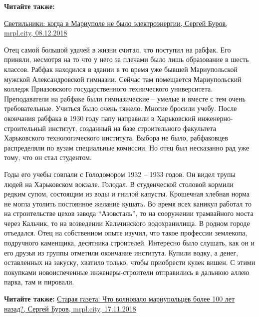 \textbf{Читайте также:} 

\href{https://mrpl.city/blogs/view/svetilniki-kogda-v-mariupole-ne-bylo-e-lektroe-nergii}{%
Светильники: когда в Мариуполе не было электроэнергии, Сергей Буров, mrpl.city, 08.12.2018}

Отец самой большой удачей в жизни считал, что поступил на рабфак. Его приняли,
несмотря на то что у него за плечами было лишь образование в шесть классов.
Рабфак находился в здании в то время уже бывшей Мариупольской мужской
Александровской гимназии. Сейчас там помещается Мариупольский колледж
Приазовского государственного технического университета. Преподаватели на
рабфаке были гимназические – умелые и вместе с тем очень требовательные.
Учиться было очень тяжело. Многие бросили учебу. После окончания рабфака в 1930
году папу направили в Харьковский инженерно-строительный институт, созданный на
базе строительного факультета Харьковского технологического института. Выбора
не было, рабфаковцев распределяли по вузам специальные комиссии. Но отец был
несказанно рад уже тому, что он стал студентом.

Годы его учебы совпали с Голодомором 1932 – 1933 годов. Он видел трупы людей на
Харьковском вокзале. Голодал. В студенческой столовой кормили редким супом,
состоящим из воды и гнилой капусты. Крошечная хлебная норма не могла утолить
постоянное желание кушать. Во время всех каникул работал то на строительстве
цехов завода \enquote{Азовсталь}, то на сооружении трамвайного моста через Кальчик, то
на возведении Кальчинского водохранилища. В родном городе отъедался. Отец на
собственном опыте изучил, что такое профессии землекопа, подручного каменщика,
десятника строителей. Интересно было слушать, как он и его друзья из группы
отметили окончание института. Купили водку, а денег, оставленных на закуску,
хватило только, чтобы приобрести кулек вишен. С этими покупками новоиспеченные
инженеры-строители отправились в дальнюю аллею парка, там и пировали.

\textbf{Читайте также:} \href{https://mrpl.city/blogs/view/staraya-gazeta-chto-volnovalo-mariupoltsev-bolee-100-let-nazad}{%
Старая газета: Что волновало мариупольцев более 100 лет назад?, Сергей Буров, mrpl.city, 17.11.2018}
